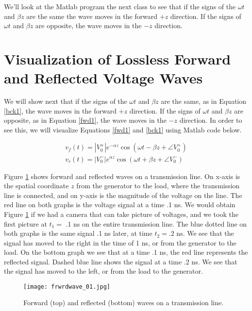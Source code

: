\documentclass{ximera}
\begin{document}
We'll look at the Matlab program the next class to see that if the signs of the $\omega t$ and
$\beta z$ are the same the wave moves in the forward $+z$
direction. If the signs of $\omega t$ and $\beta z$ are opposite, the
wave moves in the $-z$ direction.



\section{Visualization of Lossless Forward and Reflected Voltage Waves}

We will show next that if  the signs of the $\omega t$ and
$\beta z$ are the same, as in Equation \ref{bck1}, the wave moves in the forward $+z$
direction. If the signs of $\omega t$ and $\beta z$ are opposite, as in Equation \ref{fwd1}, the
wave moves in the $-z$ direction. In order to see this, we will visualize Equations \ref{fwd1} and \ref{bck1} using Matlab code below.

\begin{eqnarray}
v_f(t)=|V_0^+| e^{ - \alpha z} \cos(\omega t - \beta z + \angle V_0^+) \label{fwd1} \\
v_r(t)= |V_0^-|e^{\alpha z} \cos(\omega t + \beta z + \angle V_0^-) \label{bck1}
\end{eqnarray}


Figure \ref{fwrdref}  shows forward and reflected waves on a transmission line. On x-axis is the spatial coordinate $z$ from the generator to the load, where the transmission line is connected,  and on y-axis is   the magnitude of the voltage on the line.   The red line on both graphs is the voltage signal at a time  .1 ns. We would obtain  Figure \ref{fwrdref} if we had a camera that can take picture of voltages, and we took the first picture at $t_1=$ .1 ns on the entire transmission line.  The blue dotted line on both graphs is the same signal .1 ns later,  at time $t_2=$.2  ns.  We see that the signal has moved to the right in the time of 1 ns, or from the generator to the load.  On the bottom graph we see that at a time .1 ns, the red line represents the  reflected signal.  Dashed blue line shows the signal  at a time .2 ns. We see  that  the signal has moved to the left, or  from the load to the generator. 


\begin{figure}[ht!]
\begin{center}
\texttt{[image: frwrdwave\_01.jpg]}
\caption{\label{fwrdref} Forward (top) and reflected (bottom) waves on a transmission line.}
\end{center}
\end{figure}
\end{document}
